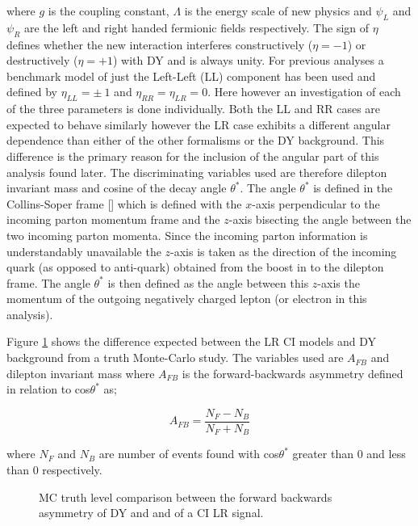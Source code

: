         where $g$ is the coupling constant, $\Lambda$ is the energy scale of new physics and $\psi_{L}$ and $\psi_{R}$ are the left and right handed fermionic fields respectively. The sign of $\eta$ defines whether the new interaction interferes constructively ($\eta = -1$) or destructively ($\eta = +1$) with DY and is always unity. For previous analyses \cite{CDF, D0, ATLAS} a benchmark model of just the Left-Left (LL) component has been used and defined by $\eta_{LL} = \pm~1$ and $\eta_{RR} = \eta_{LR} = 0$. Here however an investigation of each of the three parameters is done individually. Both the LL and RR cases are expected to behave similarly however the LR case exhibits a different angular dependence than either of the other formalisms or the DY background. This difference is the primary reason for the inclusion of the angular part of this analysis found later. The discriminating variables used are therefore dilepton invariant mass and cosine of the decay angle $\theta^{*}$. The angle $\theta^{*}$ is defined in the Collins-Soper frame [\cite{PhysRevD.16.2219}] which is defined with the $x$-axis perpendicular to the incoming parton momentum frame and the $z$-axis bisecting the angle between the two incoming parton momenta. Since the incoming parton information is understandably unavailable the $z$-axis is taken as the direction of the incoming quark (as opposed to anti-quark) obtained from the boost in to the dilepton frame. The angle $\theta^{*}$ is then defined as the angle between this $z$-axis the momentum of the outgoing negatively charged lepton (or electron in this analysis).

        Figure \ref{fig:theoryAFB} shows the difference expected between the LR CI models and DY background from a truth Monte-Carlo study. The variables used are $A_{FB}$ and dilepton invariant mass where $A_{FB}$ is the forward-backwards asymmetry defined in relation to cos$\theta^{*}$ as;

        \begin{equation}
            A_{FB} = 
                \frac{N_{F} - N_{B}}{N_{F} + N_{B}}
            \label{eq:AFB}
        \end{equation}

        where $N_{F}$ and $N_{B}$ are number of events found with cos$\theta^{*}$ greater than 0 and less than 0 respectively.
        
        \begin{figure}[h]
            \begin{center}
            \end{center}
            \caption{MC truth level comparison between the forward backwards asymmetry of DY and and of a CI LR signal.}
            \label{fig:theoryAFB}
        \end{figure}

